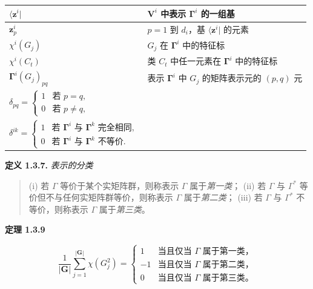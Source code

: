 \medskip
\noindent\begin{tabular}{|l|p{}|}
\hline
$\langle \mathbf{z}^{i}|$ & $\mathbf{V}^{i}$ 中表示 $\mathbf{\Gamma}^{i}$ 的一组基 \\ \hline
$\mathbf{z}_{p}^{i}$ & $p = 1$ 到 $d_{i}$，基 $\langle \mathbf{z}^{i}|$ 的元素 \\ \hline
$\chi^{i}(G_{j})$ & $G_{j}$ 在 $\mathbf{\Gamma}^{i}$ 中的特征标 \\ \hline
$\chi^{i}(C_{t})$ & 类 $C_{t}$ 中任一元素在 $\mathbf{\Gamma}^{i}$ 中的特征标 \\ \hline
$\mathbf{\Gamma}^{i}(G_{j})_{pq}$ & 表示 $\mathbf{\Gamma}^{i}$ 中 $G_{j}$ 的矩阵表示元的 $(p, q)$ 元 \\ \hline
$\delta_{pq} = \begin{cases}1 & \text{若 } p = q, \\ 0 & \text{若 } p \neq q,\end{cases}$ & \\ \hline
$\delta^{ik} = \begin{cases}1 & \text{若 } \mathbf{\Gamma}^{i} \text{ 与 } \mathbf{\Gamma}^{k} \textit{ 完全相同}, \\ 0 & \text{若 } \mathbf{\Gamma}^{i} \text{ 与 } \mathbf{\Gamma}^{k} \text{ 不等价}.\end{cases}$ & \\ \hline
\end{tabular}
\medskip

\textbf{定义 1.3.7.} \textit{表示的分类}

\begin{quote}
(i) 若 $\Gamma$ 等价于某个实矩阵群，则称表示 $\Gamma$ 属于\textit{第一类}；
(ii) 若 $\Gamma$ 与 $\Gamma^{*}$ 等价但不与任何实矩阵群等价，则称表示 $\Gamma$ 属于\textit{第二类}；
(iii) 若 $\Gamma$ 与 $\Gamma^{*}$ 不等价，则称表示 $\Gamma$ 属于\textit{第三类}。
\end{quote}

\textbf{定理 1.3.9}

\begin{equation*}
\frac{1}{|\mathbf{G}|}\sum_{j=1}^{|\mathbf{G}|} \chi(G_{j}^{2}) = \begin{cases} 1 & \textit{当且仅当 } \Gamma \textit{ 属于第一类，} \\ -1 & \textit{当且仅当 } \Gamma \textit{ 属于第二类，} \\ 0 & \textit{当且仅当 } \Gamma \textit{ 属于第三类。} \end{cases}
\tag{1.3.12}
\end{equation*}

